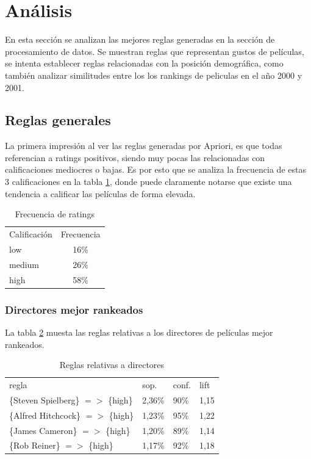 \documentclass[journal]{IEEEtran}
\begin{document}
\section{Análisis}
En esta sección se analizan las mejores reglas generadas en la sección
de procesamiento de datos. Se muestran reglas que representan gustos
de películas, se intenta establecer reglas relacionadas con la
posición demográfica, como también analizar similitudes entre los
los rankings de peliculas en el año 2000 y 2001.

\subsection{Reglas generales}
La primera impresión al ver las reglas generadas por Apriori, es que todas 
referencian a ratings positivos, siendo muy pocas las relacionadas con 
calificaciones mediocres o bajas. Es por esto que se analiza la frecuencia
de estas 3 calificaciones en la tabla \ref{rating_freq}, donde puede
claramente notarse que existe una tendencia a calificar las 
películas de forma elevada.

\begin{table}[ht!]
\caption{Frecuencia de ratings}
\label{rating_freq}
\centering
\begin{tabular}{l c}
Calificación & Frecuencia \\
low &  16\% \\
medium & 26\% \\
high & 58\%
\end{tabular}
\end{table}

\subsubsection{Directores mejor rankeados}
La tabla \ref{table_best_directors} muesta las reglas relativas a los 
directores de películas mejor rankeados.
\begin{table}[ht!]
\caption{Reglas relativas a directores}
\label{table_best_directors}
\centering
\begin{tabular}{l l l l }
regla & sop. & conf. & lift \\
\{Steven Spielberg\} $=$$>$ \{high\} & 2,36\% & 90\% & 1,15 \\
\{Alfred Hitchcock\} $=$$>$ \{high\} & 1,23\% & 95\% & 1,22 \\
\{James Cameron\} $=$$>$ \{high\} & 1,20\% & 89\% & 1,14 \\
\{Rob Reiner\} $=$$>$ \{high\} & 1,17\% & 92\% & 1,18
\end{tabular}
\end{table}
\end{document}
